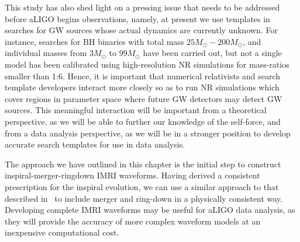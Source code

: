 This study has also shed light on  a pressing issue that needs to be addressed before aLIGO begins observations, namely, at present we use templates  in searches for GW sources  whose actual dynamics are currently unknown. For instance, searches for BH binaries with total mass  \(25M_{\odot} - 200M_{\odot}\), and individual masses from \(3M_{\odot}\) to \(99M_{\odot}\) have been carried out, but not a single model has been calibrated using high-resolution NR simulations for mass-ratios smaller than 1:6. Hence, it is important that numerical relativists and search template developers interact more closely so as to run NR simulations which cover regions in parameter space where future GW detectors may detect GW sources. This meaningful interaction will be important from a theoretical perspective, as we will be able to further our knowledge of the self-force, and from a data analysis perspective, as we will be in a stronger position to develop accurate search templates for use in data analysis. 

The approach we have outlined in this chapter is the initial step to construct inspiral-merger-ringdown IMRI waveforms. Having derived a consistent prescription for the inspiral evolution, we can use a similar approach to that described in~\cite{ori} to include merger and ring-down in a physically consistent way. Developing complete IMRI waveforms may be useful for aLIGO data analysis, as they will provide the accuracy of more complex waveform models at an inexpensive computational cost.  
